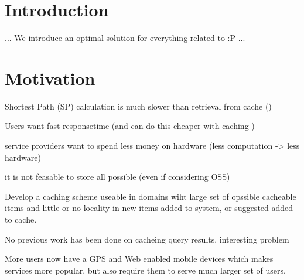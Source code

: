 \section{Introduction} \label{sec:intro}

... We introduce an optimal solution for everything related to \spath :P ...

\section{Motivation}
Shortest Path (SP) calculation is much slower than retrieval from cache ()

Users want fast responsetime (and \spath can do this cheaper with caching \cite{ref.})

\spath service providers want to spend less money on hardware (less computation -> less hardware)

it is not feasable to store all possible \spaths (even if considering OSS)

Develop a caching scheme useable in domains wiht large set of opssible cacheable items and little or no  locality in new items added to system, or suggested added to cache.

No previous work has been done on cacheing \spath query results. interesting problem

More users now have a GPS and Web enabled mobile devices which makes \spath services more popular, but also require them to serve much larger set of users.








% 
% 


